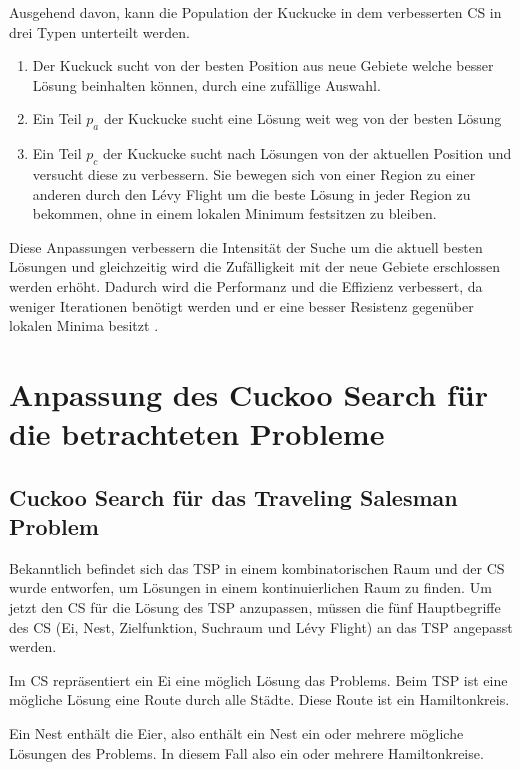 \documentclass[conference]{IEEEtran}
\begin{document}
      Ausgehend davon, kann die Population der Kuckucke in dem verbesserten CS in drei Typen unterteilt werden.

      \begin{enumerate}
        \item Der Kuckuck sucht von der besten Position aus neue Gebiete welche besser Lösung beinhalten können, durch eine zufällige Auswahl.
        \item Ein Teil $p_{a}$ der Kuckucke sucht eine Lösung weit weg von der besten Lösung
        \item Ein Teil $p_{c}$ der Kuckucke sucht nach Lösungen von der aktuellen Position und versucht diese zu 
          verbessern. Sie bewegen sich von einer Region zu einer anderen durch den Lévy Flight um die beste Lösung 
          in jeder Region zu bekommen, ohne in einem lokalen Minimum festsitzen zu bleiben.
      \end{enumerate}

      Diese Anpassungen verbessern die Intensität der Suche um die aktuell besten Lösungen und gleichzeitig wird 
      die Zufälligkeit mit der neue Gebiete erschlossen werden erhöht. Dadurch wird die Performanz und die Effizienz 
      verbessert, da weniger Iterationen benötigt werden und er eine besser Resistenz gegenüber lokalen Minima besitzt \cite{b9}.

  \section{Anpassung des Cuckoo Search für die betrachteten Probleme}
   

    \subsection{Cuckoo Search für das Traveling Salesman Problem}
      Bekanntlich befindet sich das TSP in einem kombinatorischen Raum und der CS wurde entworfen, 
      um Lösungen in einem kontinuierlichen Raum zu finden. Um jetzt den CS für die Lösung des TSP anzupassen, 
      müssen die fünf Hauptbegriffe des CS (Ei, Nest, Zielfunktion, Suchraum und Lévy Flight) an das TSP angepasst werden. 

      Im CS repräsentiert ein Ei eine möglich Lösung das Problems. Beim TSP ist eine mögliche Lösung eine 
      Route durch alle Städte. Diese Route ist ein Hamiltonkreis.

      Ein Nest enthält die Eier, also enthält ein Nest ein oder mehrere mögliche Lösungen des Problems. 
      In diesem Fall also ein oder mehrere Hamiltonkreise.
\end{document}
